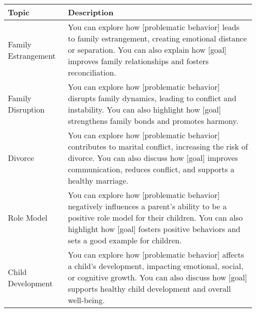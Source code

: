 \begin{table*}[tb]
\centering
\begin{tabularx}{\textwidth}{lX}
\toprule
Topic            & Description                                            \\ \midrule
Family Estrangement         & You can explore how [problematic behavior] leads to family estrangement, creating emotional distance or separation. You can also explain how [goal] improves family relationships and fosters reconciliation.                                                                                                                                                                                                                      \\ \hline
Family Disruption           & You can explore how [problematic behavior] disrupts family dynamics, leading to conflict and instability. You can also highlight how [goal] strengthens family bonds and promotes harmony.                                                                                                                                                                                                                                         \\ \hline
Divorce                     & You can explore how [problematic behavior] contributes to marital conflict, increasing the risk of divorce. You can also discuss how [goal] improves communication, reduces conflict, and supports a healthy marriage.                                                                                                                                                                                                             \\ \hline
Role Model                  & You can explore how [problematic behavior] negatively influences a parent’s ability to be a positive role model for their children. You can also highlight how [goal] fosters positive behaviors and sets a good example for children.                                                                                                                                                                                             \\ \hline
Child Development           & You can explore how [problematic behavior] affects a child’s development, impacting emotional, social, or cognitive growth. You can also discuss how [goal] supports healthy child development and overall well-being.                                                                                                                                                                                                             \\ \hline

\end{tabularx}
\end{table*}

